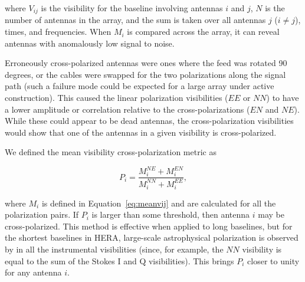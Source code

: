 where $V_{ij}$ is the visibility for the baseline involving antennas $i$ and
$j$, $N$ is the number of antennas in the array, and the sum is taken over all
antennas $j$ ($i \neq j$), times, and frequencies. When $M_{i}$ is compared across the array, 
it can reveal antennas with anomalously low signal to noise.

Erroneously cross-polarized antennas were ones where the feed was rotated 90 degrees, or the
cables were swapped for the two polarizations along the signal path (such a failure mode
could be expected for a large array under active construction). This caused
the linear polarization visibilities ($EE$ or $NN$) to have a lower amplitude or
correlation relative to the cross-polarizations ($EN$ and $NE$). While these could appear to be dead antennas, 
the cross-polarization visibilities would show that one of the antennas in a given
visibility is cross-polarized.

We defined the mean visibility cross-polarization metric as 

\begin{equation}
P_{i} = \frac{M_{i}^{NE} + M_{i}^{EN}}{M_{i}^{NN} + M_{i}^{EE}},
\label{eq:meancrossvij}
\end{equation}

where $M_{i}$ is defined in Equation~\ref{eq:meanvij} and are calculated for
all the polarization pairs. If $P_{i}$ is larger than some threshold, then
antenna ${i}$ may be cross-polarized. This method is effective when applied
to long baselines, but for the shortest baselines in HERA, large-scale astrophysical polarization
\citep[e.g.][]{Lenc.16} is observed by in all the instrumental visibilities 
(since, for example, the $NN$ visibility is equal to the sum of the 
Stokes I and Q visibilities). This brings $P_{i}$ closer to unity
for any antenna $i$.

